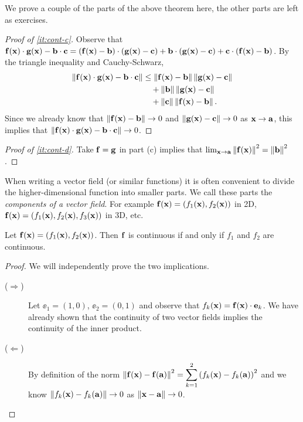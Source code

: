 We prove a couple of the parts of the above theorem here, the other parts are left as exercises.

\begin{proof}[Proof of \ref{it:cont-c}]
    Observe that  \(
    \mathbf{f}(\mathbf{x})\cdot\mathbf{g}(\mathbf{x}) - \mathbf{b}\cdot \mathbf{c}
    = (\mathbf{f}(\mathbf{x})-\mathbf{b})\cdot(\mathbf{g}(\mathbf{x})-\mathbf{c}) + \mathbf{b}\cdot(\mathbf{g}(\mathbf{x})-\mathbf{c}) + \mathbf{c}\cdot(\mathbf{f}(\mathbf{x})-\mathbf{b})
    \).
    By the triangle inequality and Cauchy-Schwarz,
    \[
        \begin{aligned}
            \left\|\mathbf{f}(\mathbf{x})\cdot\mathbf{g}(\mathbf{x}) - \mathbf{b}\cdot \mathbf{c} \right\|
             & \leq \left\|\mathbf{f}(\mathbf{x})-\mathbf{b}\right\| \left\|\mathbf{g}(\mathbf{x})-\mathbf{c}\right\| \\
             & \quad + \left\|\mathbf{b}\right\|\left\|\mathbf{g}(\mathbf{x})-\mathbf{c}\right\|        \\
             & \quad + \left\|\mathbf{c}\right\| \left\|\mathbf{f}(\mathbf{x})-\mathbf{b}\right\|.
        \end{aligned}
    \]
    Since we already know that \(\left\|\mathbf{f}(\mathbf{x})-\mathbf{b}\right\| \to 0\) and \(\left\|\mathbf{g}(\mathbf{x})-\mathbf{c}\right\| \to 0\) as \(\mathbf{x} \to \mathbf{a}\), this implies that \(\left\|\mathbf{f}(\mathbf{x})\cdot\mathbf{g}(\mathbf{x}) - \mathbf{b}\cdot \mathbf{c} \right\|\to 0\).
\end{proof}

\begin{proof}[Proof of \ref{it:cont-d}]
    Take \(\mathbf{f} = \mathbf{g}\) in part (c) implies that \(   \lim_{\mathbf{x} \to \mathbf{a}} \left\|\mathbf{f}(\mathbf{x})\right\|^2 = \left\|\mathbf{b}\right\|^2\).
\end{proof}


When writing a vector field (or similar functions) it is often convenient to divide the higher-dimensional function into smaller parts.
We call these parts the \emph{components of a vector field}.
For example \(\mathbf{f}(\mathbf{x}) = \left(f_1(\mathbf{x}),f_2(\mathbf{x})\right)\) in 2D, \(\mathbf{f}(\mathbf{x}) = \left(f_1(\mathbf{x}),f_2(\mathbf{x}),f_3(\mathbf{x})\right)\) in 3D, etc.

\begin{theorem}
    Let \(\mathbf{f}(\mathbf{x}) = \left(f_1(\mathbf{x}),f_2(\mathbf{x})\right)\).
    Then \(\mathbf{f}\) is continuous if and only if \(f_1\) and \(f_2\) are continuous.
\end{theorem}
\begin{proof}
    We will independently prove the two implications.
    \begin{description}
        \item[(\(\Rightarrow\))]
              Let
              \( \ee_1=(1,0) \), \( \ee_2=(0,1) \)
              and observe that \(f_k(\mathbf{x}) = \mathbf{f}(\mathbf{x})\cdot \mathbf{e}_k\).
              We have already shown that the continuity of two vector fields implies the continuity of the inner product.
        \item[(\(\Leftarrow \))]
              By definition of the norm
              \(\left\|\mathbf{f}(\mathbf{x})-\mathbf{f}(\mathbf{a})\right\|^2 = \displaystyle\sum_{k=1}^{2}{(f_k(\mathbf{x})-f_k(\mathbf{a}))}^2\)
              and we know \(\left\|f_k(\mathbf{x})-f_k(\mathbf{a})\right\| \to 0\) as \(\left\|\mathbf{x}-\mathbf{a}\right\|\to 0\). \qedhere
    \end{description}
\end{proof}

